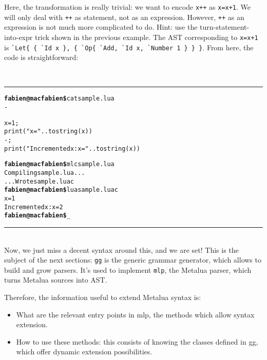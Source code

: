 Here, the transformation is really trivial: we want to encode
\verb|x++| as \verb|x=x+1|. We will only deal with \verb|++| as
statement, not as an expression. However, \verb|++| as an expression is not
much more complicated to do. Hint: use the turn-statement-into-expr
trick shown in the previous example. The AST corresponding to
\verb|x=x+1| is 
\verb|`Let{ { `Id x }, { `Op{ `Add, `Id x, `Number 1 } } }|. From
here, the code is straightforward:

~\\\hrule
\begin{alltt}
{\bf{}fabien@macfabien\$} cat sample.lua
-

x = 1;                  
print ("x = " .. tostring (x))
-; 
print ("Incremented x: x = " .. tostring (x))

{\bf{}fabien@macfabien\$} mlc sample.lua
Compiling sample.lua...
...Wrote sample.luac
{\bf{}fabien@macfabien\$} lua sample.luac
x = 1
Incremented x: x = 2
{\bf{}fabien@macfabien\$} _
\end{alltt}
\hrule~\\

Now, we just miss a decent syntax around this, and we are set! This is
the subject of the next sections: \verb|gg| is the generic grammar
generator, which allows to build and grow parsers. It's used to
implement \verb|mlp|, the Metalua parser, which turns Metalua sources
into AST.

Therefore, the information useful to extend Metalua syntax is:

\begin{itemize}
\item What are the relevant entry points in mlp, the methods which
  allow syntax extension.
\item How to use these methods: this consists of knowing the classes
  defined in gg, which offer dynamic extension possibilities.
\end{itemize}
